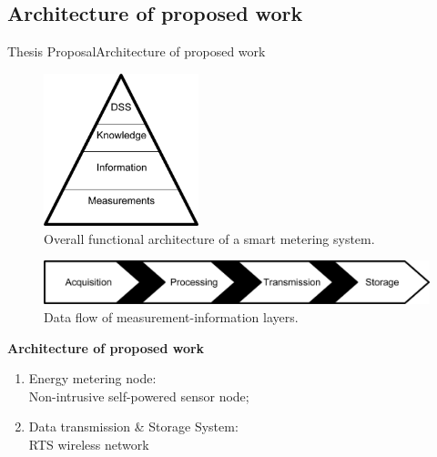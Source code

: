 \subsection{Architecture of proposed work}

\begin{frame}{Thesis Proposal}{Architecture of proposed work}
	
	\begin{minipage}[t]{0.48\linewidth}
\vspace{-2em}
		\begin{figure}[ht!]
			\centering
			\includegraphics[width=0.4\textwidth,keepaspectratio]{figures/40.Method/pyramid}
			\caption{Overall functional architecture of a smart metering system.}
		\end{figure}

	\end{minipage}\hfill
\pause
	\begin{minipage}[t]{0.48\linewidth}
		
		\vspace{2em}
		\begin{figure}[ht!]
			\centering

			\includegraphics[width=\textwidth,keepaspectratio]{figures/40.Method/data_flow}
			\caption{Data flow of measurement-information layers.}
		\end{figure}
	\end{minipage}
\pause
\begin{block}{\textbf{Architecture of proposed work}}
	
		\begin{enumerate}
		\item  Energy metering node:\\Non-intrusive self-powered sensor node;
		\item  Data transmission \&  Storage System: \\RTS wireless network
	\end{enumerate}
		
	
		

	
\end{block}

\end{frame}

